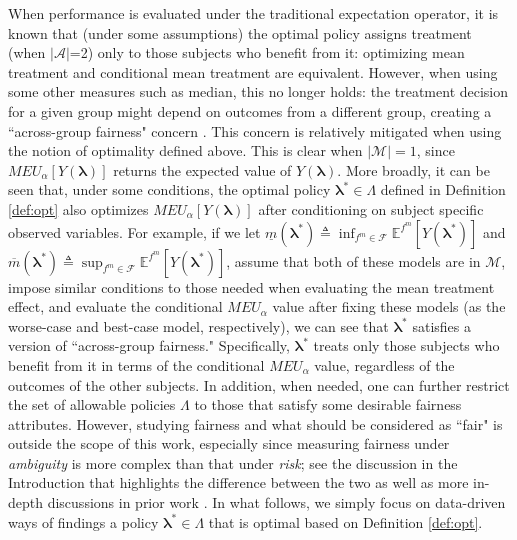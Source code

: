 \documentclass[opre,nonblindrev]{informs2}%
\newcommand{\teq}{\triangleq}
\newcommand{\1}{\hbox{\rm 1\kern-.35em 1}}
\newcommand{\E}{\mathbb E}
\newcommand{\MA}{\mathscr A}
\newcommand{\MM}{\mathscr M}
\newcommand{\MF}{\mathscr F}
\newcommand{\blambda}{\boldsymbol{\lambda}}
\newcommand{\un}{\underline}
\newcommand{\ov}{\overline}
\begin{document}
\begin{remark}\label{remark:fair}
When performance is evaluated under the  traditional expectation operator, it is known that (under some assumptions) the optimal policy assigns treatment (when $|\MA|$=2) only to those subjects who benefit from it: optimizing mean treatment  and conditional mean treatment are equivalent.  However, when using some other measures such as median, this no longer holds: the treatment decision for a given group might depend on outcomes from a different group, creating a ``across-group fairness" concern \citep[see, e.g., ][]{Leqi2021}. This concern is relatively mitigated when using the notion of optimality defined above. This is clear when $|\MM|=1$, since $MEU_\alpha [Y (\blambda)]$ returns the expected value of $Y (\blambda)$. More broadly, it can be seen that, under some conditions, the optimal policy ${\blambda}^*\in\Lambda$ defined in Definition \ref{def:opt} also optimizes $MEU_\alpha [Y (\blambda)]$ after conditioning on subject specific observed variables. For example, if we let $\un m (\blambda^*)\teq \inf_{f^m\in\MF} \E^{f^m} [Y (\blambda^*)]$ and  $\ov m (\blambda^*)\teq \sup_{f^m\in\MF} \E^{f^m} [Y (\blambda^*)]$, assume that  both of these models are in $\MM$, impose similar conditions to those needed when evaluating the mean treatment effect, and evaluate the conditional  $MEU_\alpha$ value after fixing these models (as the worse-case and best-case model, respectively), we can see that $\blambda^*$ satisfies a version of  ``across-group fairness."  Specifically, $\blambda^*$ treats only those subjects who benefit from it in terms of the conditional  $MEU_\alpha$ value, regardless of the outcomes of the other subjects. In addition, when needed, one can further restrict the set of allowable policies $\Lambda$ to those that satisfy some desirable fairness attributes.  However, studying fairness and what should be considered as ``fair" is outside the scope of this work, especially since measuring fairness under {\em ambiguity} is more complex than that under {\em risk};  see the discussion in the Introduction that highlights the difference between the two as well as more in-depth discussions in prior work \citep[see, e.g.,][] {Saghafian20161, Saghafian2018}.   In what follows, we simply focus on data-driven ways of findings a policy ${\blambda}^*\in\Lambda$ that is optimal based on Definition \ref{def:opt}.
\end{remark}
\end{document}
